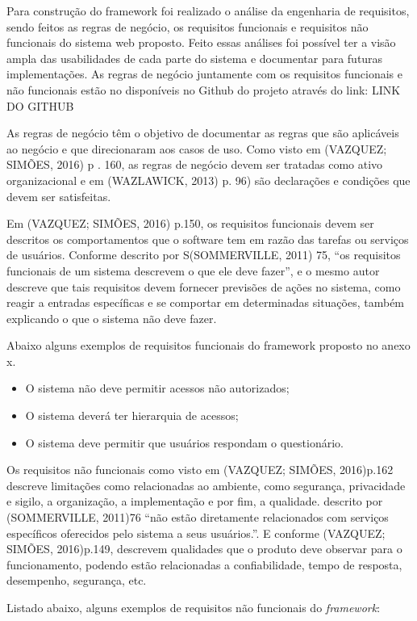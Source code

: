 \documentclass[
	12pt,				%
	openright,			%
	oneside,			%
	a4paper,			%
	english,			%
	french,				%
	spanish,			%
	brazil,				%
	]{abntex2}
\begin{document}
Para construção do framework foi realizado o análise da engenharia de requisitos, sendo feitos as regras de negócio, os requisitos funcionais e requisitos não funcionais do sistema web proposto. Feito essas análises foi possível ter a visão ampla das usabilidades de cada parte do sistema e documentar para futuras implementações.  As regras de negócio juntamente com os requisitos funcionais e não funcionais estão no disponíveis no Github do projeto através do link: LINK DO GITHUB

As regras de negócio têm o objetivo de documentar as regras que são aplicáveis ao negócio e que direcionaram aos casos de uso. Como visto em (VAZQUEZ; SIMÕES, 2016) p . 160, as regras de negócio devem ser tratadas como ativo organizacional e em (WAZLAWICK, 2013) p. 96) são declarações e condições que devem ser satisfeitas.

Em (VAZQUEZ; SIMÕES, 2016) p.150, os requisitos funcionais devem ser descritos os comportamentos que o software tem em razão das tarefas ou serviços de usuários. Conforme descrito por S(SOMMERVILLE, 2011) 75, “os requisitos funcionais de um sistema descrevem o que ele deve fazer”, e o mesmo autor descreve que tais requisitos devem fornecer previsões de ações no sistema, como reagir a entradas específicas e se comportar em determinadas situações, também explicando o que o sistema não deve fazer.

Abaixo alguns exemplos de requisitos funcionais do framework proposto no anexo x.
\begin{itemize}
\item O sistema não deve permitir acessos não autorizados;
\item O sistema deverá ter hierarquia de acessos;
\item O sistema deve permitir que usuários respondam o questionário.
\end{itemize}

Os requisitos não funcionais como visto em (VAZQUEZ; SIMÕES, 2016)p.162 descreve limitações como relacionadas ao ambiente, como segurança, privacidade e sigilo, a organização, a implementação e por fim, a qualidade. descrito por (SOMMERVILLE, 2011)76 “não estão diretamente relacionados com serviços específicos oferecidos pelo sistema a seus usuários.”. E conforme (VAZQUEZ; SIMÕES, 2016)p.149, descrevem qualidades que o produto deve observar para o funcionamento, podendo estão relacionadas a confiabilidade, tempo de resposta, desempenho, segurança, etc.

Listado abaixo, alguns exemplos de requisitos não funcionais do \textit{framework}:
\end{document}
